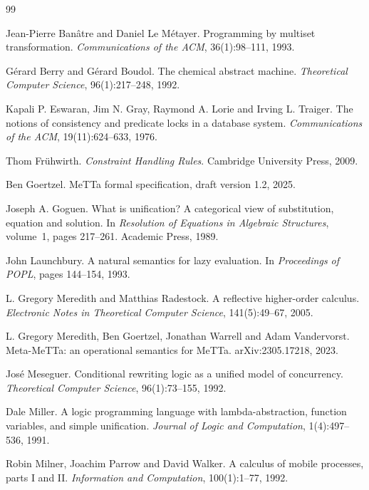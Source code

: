 \documentclass[11pt]{article}
\theoremstyle{plain}
\theoremstyle{definition}
\theoremstyle{remark}
\begin{document}
\begin{thebibliography}{99}

Jean-Pierre Ban\^atre and Daniel Le M\'etayer.
Programming by multiset transformation.
\emph{Communications of the ACM}, 36(1):98--111, 1993.

G\'erard Berry and G\'erard Boudol.
The chemical abstract machine.
\emph{Theoretical Computer Science}, 96(1):217--248, 1992.

Kapali P. Eswaran, Jim N. Gray, Raymond A. Lorie and Irving L. Traiger.
The notions of consistency and predicate locks in a database system.
\emph{Communications of the ACM}, 19(11):624--633, 1976.

Thom Fr\"uhwirth.
\emph{Constraint Handling Rules}.
Cambridge University Press, 2009.

Ben Goertzel.
MeTTa formal specification, draft version 1.2, 2025.

Joseph A. Goguen.
What is unification? A categorical view of substitution, equation and solution.
In \emph{Resolution of Equations in Algebraic Structures}, volume~1, pages 217--261.
Academic Press, 1989.

John Launchbury.
A natural semantics for lazy evaluation.
In \emph{Proceedings of POPL}, pages 144--154, 1993.

L. Gregory Meredith and Matthias Radestock.
A reflective higher-order calculus.
\emph{Electronic Notes in Theoretical Computer Science}, 141(5):49--67, 2005.

L. Gregory Meredith, Ben Goertzel, Jonathan Warrell and Adam Vandervorst.
Meta-MeTTa: an operational semantics for MeTTa.
arXiv:2305.17218, 2023.

Jos\'e Meseguer.
Conditional rewriting logic as a unified model of concurrency.
\emph{Theoretical Computer Science}, 96(1):73--155, 1992.

Dale Miller.
A logic programming language with lambda-abstraction, function variables, and simple
unification.
\emph{Journal of Logic and Computation}, 1(4):497--536, 1991.

Robin Milner, Joachim Parrow and David Walker.
A calculus of mobile processes, parts I and II.
\emph{Information and Computation}, 100(1):1--77, 1992.


\end{thebibliography}
\end{document}
